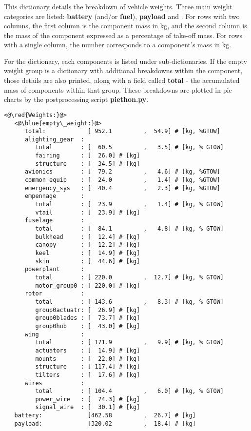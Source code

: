 \subsubsection{}
This dictionary details the breakdown of vehicle weights. Three main weight categories are listed: \textbf{battery} (and/or \textbf{fuel}), \textbf{payload} and . For rows with two columns, the first column is the component mass in kg, and the second column is the mass of the component expressed as a percentage of take-off mass. For rows with a single column, the number corresponds to a component's mass in kg.

For the  dictionary, each components is listed under sub-dictionaries. If the empty weight group is a dictionary with additional breakdowns within the component, those details are also printed, along with a field called \textbf{total} - the accumulated mass of components within that group. These breakdowns are plotted in pie charts by the postprocessing script \textbf{piethon.py}.
 
\begin{lstlisting}
<@\red{Weights:}@>
   <@\blue{empty\_weight:}@>
      total:            [ 952.1         ,  54.9] # [kg, %GTOW]
      alighting_gear  :
         total        : [  60.5         ,   3.5] # [kg, % GTOW]
         fairing      : [  26.0] # [kg]
         structure    : [  34.5] # [kg]
      avionics        : [  79.2         ,   4.6] # [kg, %GTOW]
      common_equip    : [  24.0         ,   1.4] # [kg, %GTOW]
      emergency_sys   : [  40.4         ,   2.3] # [kg, %GTOW]
      empennage       :
         total        : [  23.9         ,   1.4] # [kg, % GTOW]
         vtail        : [  23.9] # [kg]
      fuselage        :
         total        : [  84.1         ,   4.8] # [kg, % GTOW]
         bulkhead     : [  12.4] # [kg]
         canopy       : [  12.2] # [kg]
         keel         : [  14.9] # [kg]
         skin         : [  44.6] # [kg]
      powerplant      :
         total        : [ 220.0         ,  12.7] # [kg, % GTOW]
         motor_group0 : [ 220.0] # [kg]
      rotor           :
         total        : [ 143.6         ,   8.3] # [kg, % GTOW]
         group0actuatr: [  26.9] # [kg]
         group0blades : [  73.7] # [kg]
         group0hub    : [  43.0] # [kg]
      wing            :
         total        : [ 171.9         ,   9.9] # [kg, % GTOW]
         actuators    : [  14.9] # [kg]
         mounts       : [  22.0] # [kg]
         structure    : [ 117.4] # [kg]
         tilters      : [  17.6] # [kg]
      wires           :
         total        : [ 104.4         ,   6.0] # [kg, % GTOW]
         power_wire   : [  74.3] # [kg]
         signal_wire  : [  30.1] # [kg]
   battery:             [462.58         ,  26.7] # [kg]
   payload:             [320.02         ,  18.4] # [kg]
\end{lstlisting}

